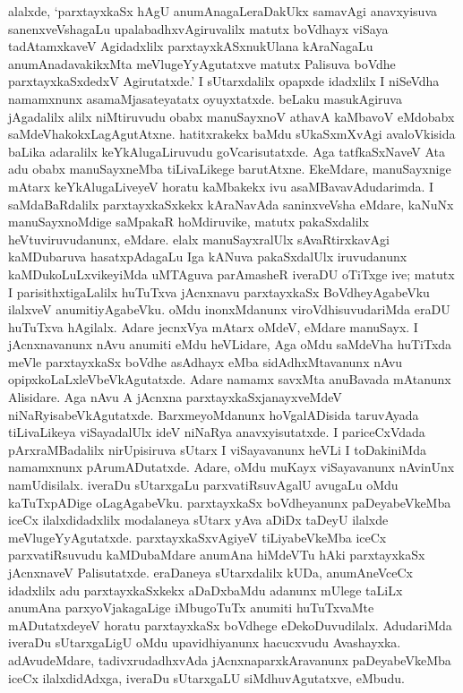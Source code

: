alalxde, `parxtayxkaSx hAgU anumAnagaLeraDakUkx samavAgi anavxyisuva sanenxveVshagaLu upalabadhxvAgiruvalilx matutx boVdhayx viSaya tadAtamxkaveV Agidadxlilx parxtayxkASxnukUlana kAraNagaLu anumAnadavakikxMta meVlugeYyAgutatxve matutx Palisuva boVdhe parxtayxkaSxdedxV Agirutatxde.' I sUtarxdalilx opapxde idadxlilx I niSeVdha namamxnunx asamaMjasateyatatx oyuyxtatxde. beLaku masukAgiruva jAgadalilx alilx niMtiruvudu obabx manuSayxnoV athavA kaMbavoV eMdobabx saMdeVhakokxLagAgutAtxne. hatitxrakekx baMdu sUkaSxmXvAgi avaloVkisida baLika adaralilx keYkAlugaLiruvudu goVcarisutatxde. Aga tatfkaSxNaveV Ata adu obabx manuSayxneMba tiLivaLikege barutAtxne. EkeMdare, manuSayxnige mAtarx keYkAlugaLiveyeV horatu kaMbakekx ivu asaMBavavAdudarimda. I saMdaBaRdalilx parxtayxkaSxkekx kAraNavAda saninxveVsha eMdare, kaNuNx manuSayxnoMdige saMpakaR hoMdiruvike, matutx pakaSxdalilx heVtuviruvudanunx, eMdare. elalx manuSayxralUlx sAvaRtirxkavAgi kaMDubaruva hasatxpAdagaLu Iga kANuva pakaSxdalUlx iruvudanunx kaMDukoLuLxvikeyiMda uMTAguva parAmasheR iveraDU oTiTxge ive; matutx I parisithxtigaLalilx huTuTxva jAcnxnavu parxtayxkaSx BoVdheyAgabeVku ilalxveV anumitiyAgabeVku. oMdu inonxMdanunx viroVdhisuvudariMda eraDU huTuTxva hAgilalx. Adare jecnxVya mAtarx oMdeV, eMdare manuSayx. I jAcnxnavanunx nAvu anumiti eMdu heVLidare, Aga oMdu saMdeVha huTiTxda meVle parxtayxkaSx boVdhe asAdhayx eMba sidAdhxMtavanunx nAvu opipxkoLaLxleVbeVkAgutatxde. Adare namamx savxMta anuBavada mAtanunx Alisidare. Aga nAvu A jAcnxna parxtayxkaSxjanayxveMdeV niNaRyisabeVkAgutatxde. BarxmeyoMdanunx hoVgalADisida taruvAyada tiLivaLikeya viSayadalUlx ideV niNaRya anavxyisutatxde. I pariceCxVdada pArxraMBadalilx nirUpisiruva sUtarx I viSayavanunx heVLi I toDakiniMda namamxnunx pArumADutatxde. Adare, oMdu muKayx viSayavanunx nAvinUnx namUdisilalx. iveraDu sUtarxgaLu parxvatiRsuvAgalU avugaLu oMdu kaTuTxpADige oLagAgabeVku. parxtayxkaSx boVdheyanunx paDeyabeVkeMba iceCx ilalxdidadxlilx modalaneya sUtarx yAva aDiDx taDeyU ilalxde meVlugeYyAgutatxde. parxtayxkaSxvAgiyeV tiLiyabeVkeMba iceCx parxvatiRsuvudu kaMDubaMdare anumAna hiMdeVTu hAki parxtayxkaSx jAcnxnaveV Palisutatxde. eraDaneya sUtarxdalilx kUDa, anumAneVceCx idadxlilx adu parxtayxkaSxkekx aDaDxbaMdu adanunx mUlege taLiLx anumAna parxyoVjakagaLige iMbugoTuTx anumiti huTuTxvaMte mADutatxdeyeV horatu parxtayxkaSx boVdhege eDekoDuvudilalx. AdudariMda iveraDu sUtarxgaLigU oMdu upavidhiyanunx hacucxvudu Avashayxka. adAvudeMdare, tadivxrudadhxvAda jAcnxnaparxkAravanunx paDeyabeVkeMba iceCx ilalxdidAdxga, iveraDu sUtarxgaLU siMdhuvAgutatxve, eMbudu.

